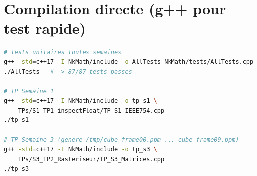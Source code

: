 \documentclass[12pt,a4paper]{report}
\begin{document}
\section{Compilation directe (g++ pour test rapide)}

\begin{lstlisting}[language=bash]
# Tests unitaires toutes semaines
g++ -std=c++17 -I NkMath/include -o AllTests NkMath/tests/AllTests.cpp
./AllTests   # -> 87/87 tests passes

# TP Semaine 1
g++ -std=c++17 -I NkMath/include -o tp_s1 \
    TPs/S1_TP1_inspectFloat/TP_S1_IEEE754.cpp
./tp_s1

# TP Semaine 3 (genere /tmp/cube_frame00.ppm ... cube_frame09.ppm)
g++ -std=c++17 -I NkMath/include -o tp_s3 \
    TPs/S3_TP2_Rasteriseur/TP_S3_Matrices.cpp
./tp_s3
\end{lstlisting}
\end{document}
